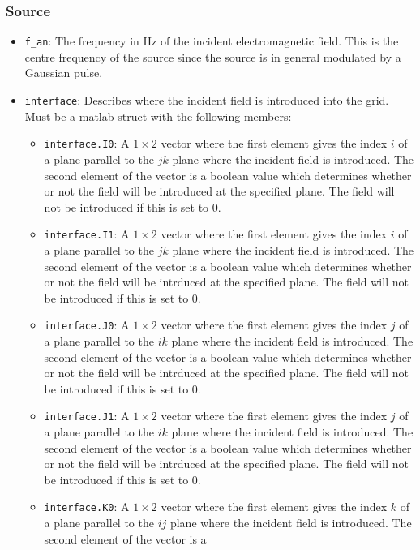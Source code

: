 \documentclass[a4paper, 12pt]{article}
\begin{document}
	\subsubsection{Source}
	\begin{itemize}
		\item \verb+f_an+: The frequency in Hz of the incident electromagnetic
		field. This is the centre frequency of the source since the source
		is in general modulated by a Gaussian pulse.
		\item \verb+interface+: Describes where the incident field is
		introduced into the grid. Must be a matlab struct with the following
		members:
		\begin{itemize}
			\item \verb+interface.I0+: A $1\times 2$ vector where the first element
			gives the index $i$ of a plane parallel to the $jk$ plane where the
			incident field is introduced. The second element of the vector is a
			boolean value which determines whether or not the field will be
			introduced at the specified plane. The field will not be introduced
			if this is set to 0.
			\item \verb+interface.I1+: A $1\times 2$ vector where the first element
			gives the index $i$ of a plane parallel to the $jk$ plane where the
			incident field is introduced. The second element of the vector is a
			boolean value which determines whether or not the field will be
			intrduced at the specified plane. The field will not be introduced
			if this is set to 0.
			\item \verb+interface.J0+: A $1\times 2$ vector where the first element
			gives the index $j$ of a plane parallel to the $ik$ plane where the
			incident field is introduced. The second element of the vector is a
			boolean value which determines whether or not the field will be
			intrduced at the specified plane. The field will not be introduced
			if this is set to 0.
			\item \verb+interface.J1+: A $1\times 2$ vector where the first element
			gives the index $j$ of a plane parallel to the $ik$ plane where the
			incident field is introduced. The second element of the vector is a
			boolean value which determines whether or not the field will be
			intrduced at the specified plane. The field will not be introduced
			if this is set to 0.
			\item \verb+interface.K0+: A $1\times 2$ vector where the first element
			gives the index $k$ of a plane parallel to the $ij$ plane where the
			incident field is introduced. The second element of the vector is a

\end{itemize}
\end{itemize}
\end{document}
